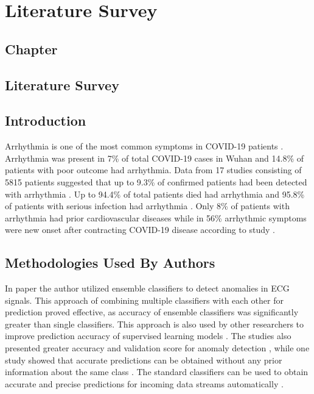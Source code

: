 \thispagestyle{fancy}
\chapter{Literature Survey} \label{ch:literature_survey}
\section*{\centering Chapter \thechapter}
\section*{\centering Literature Survey}
\nocite{*}

\section{Introduction} \label{sec:introduction_literature_survey}

Arrhythmia is one of the most common symptoms in COVID-19 patients
\cite{babapoor2020arrhythmia}. Arrhythmia was present in 7\% of total COVID-19 cases in Wuhan
and 14.8\% of patients with poor outcome had arrhythmia. Data from 17 studies consisting of
5815 patients suggested that up to 9.3\% of confirmed patients had been detected with
arrhythmia \cite{mulia2021atrial, liu2020clinical}. Up to 94.4\% of total patients died had
arrhythmia and 95.8\% of patients with serious infection had arrhythmia
\cite{beri2020cardiac,ren2020clinical}. Only 8\% of patients with arrhythmia had prior
cardiovascular diseases while in 56\% arrhythmic symptoms were new onset after contracting
COVID-19 disease according to study
\cite{babapoor2020arrhythmia, liu2020clinical, yarmohammadi2021frequency}.

\section{Methodologies Used By Authors} \label{sec:methodologies_used_by_authors}

In paper \cite{sun2020multi} the author utilized ensemble classifiers to detect anomalies in
ECG signals. This approach of combining multiple classifiers with each other for prediction
proved effective, as accuracy of ensemble classifiers was significantly greater than single
classifiers. This approach is also used by other researchers to improve prediction accuracy of
supervised learning models \cite{huang2020accurate,rajak2020applying,liu2020parallel}. The
studies also presented greater accuracy and validation score for anomaly detection
\cite{huang2020accurate,liu2020parallel}, while one study showed that accurate predictions can
be obtained without any prior information about the same class \cite{rajak2020applying}. The
standard classifiers can be used to obtain accurate and precise predictions for incoming data
streams automatically \cite{imbrea2021automated}.

